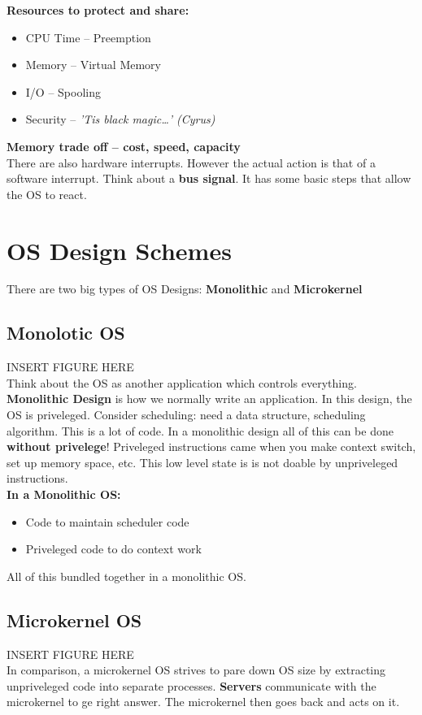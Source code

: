 \documentclass[../base_file/cs1550_notes.tex]{subfiles}
\begin{document}
\textbf{Resources to protect and share:}
	\begin{itemize}
	\item CPU Time -- Preemption
	\item Memory -- Virtual Memory
	\item I/O -- Spooling
	\item Security -- \textit{'Tis black magic\ldots' (Cyrus)}
	\end{itemize}
\textbf{Memory trade off -- cost, speed, capacity}\\

There are also hardware interrupts.  However the actual action is that of a software interrupt.  Think
about a \textbf{bus signal}.  It has some basic steps that allow the OS to react.
\pagebreak
\section{OS Design Schemes}
There are two big types of OS Designs: \textbf{Monolithic} and \textbf{Microkernel}

\subsection{Monolotic OS}
INSERT FIGURE HERE\\
Think about the OS as another application which controls everything.  \textbf{Monolithic Design} is how
we normally write an application.  In this design, the OS is priveleged.  Consider scheduling: need a 
data structure, scheduling algorithm.  This is a lot of code.  In a monolithic design all of this can
be done \textbf{without privelege}!  Priveleged instructions came when you make context switch, set up
memory space, etc. This low level state is is not doable by unpriveleged instructions.\\

\textbf{In a Monolithic OS:}
	\begin{itemize}
	\item Code to maintain scheduler code
	\item Priveleged code to do context work
	\end{itemize}
All of this bundled together in a monolithic OS.

\subsection{Microkernel OS}
INSERT FIGURE HERE\\
In comparison, a microkernel OS strives to pare down OS size by extracting unpriveleged code into separate
processes.  \textbf{Servers} communicate with the microkernel to ge right answer.  The microkernel then
goes back and acts on it.
\end{document}
